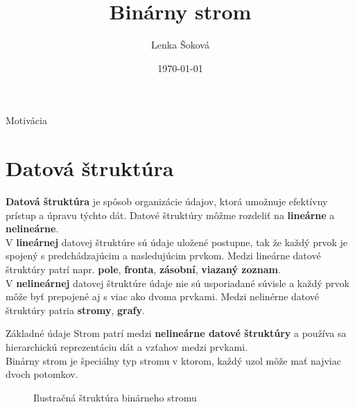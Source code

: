 \documentclass[11pt]{beamer}
\title{Binárny strom}
\author{Lenka Šoková}
\institute[xsokov01]{\\Vysoké učenie technické v~Brne \\Fakulta informačních technológií\\ \medskip \href{mailto:xsokov01@stud.fit.vutbr.cz}{xsokov01@stud.fit.vutbr.cz}}
\date{\scriptsize{\today}}
\begin{document}
\begin{frame}
\titlepage
\end{frame}

\begin{frame}{Motivácia}
\section{Datová štruktúra}
\textbf{Datová štruktúra} je spôsob organizácie údajov, ktorá umožnuje efektívny prístup a úpravu týchto dát.
Datové štruktúry môžme rozdeliť na \textbf{lineárne} a \textbf{nelineárne}.\\\medskip
V \textbf{lineárnej} datovej štruktúre sú údaje uložené postupne, tak že každý prvok je spojený s predchádzajúcim a nasledujúcim prvkom. Medzi lineárne datové štruktúry patrí napr. \textbf{pole}, \textbf{fronta}, \textbf{zásobní}, \textbf{viazaný zoznam}.\\\medskip
V \textbf{nelineárnej} datovej štruktúre údaje nie sú usporiadané súvisle a každý prvok môže byť prepojené aj s viac ako dvoma prvkami. Medzi nelinérne datové štruktúry patria \textbf{stromy}, \textbf{grafy}. 
\end{frame}

\begin{frame}{Základné údaje}
Strom patrí medzi \textbf{nelineárne datové štruktúry} a používa sa hierarchickú reprezentáciu dát a vzťahov medzi prvkami.\\
Binárny strom je špeciálny typ stromu v ktorom, každý uzol môže mať najviac dvoch potomkov.

\begin{figure}[ht]\label{BinaryTree}
\caption{Ilustračná štruktúra binárneho stromu}
\end{figure}
\end{frame}
\end{document}
